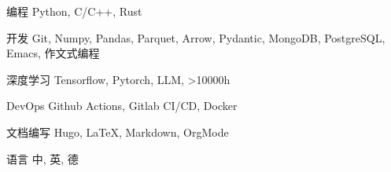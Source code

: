\documentclass[../cv_cn.tex]{subfiles}
\begin{document}


\begin{cvskills}

  \cvskill
    {编程} %
    {Python, C/C++, Rust} %

  \cvskill
    {开发} %
    {Git, Numpy, Pandas, Parquet, Arrow, Pydantic, MongoDB, PostgreSQL, Emacs, 作文式编程} %

  \cvskill
    {深度学习} %
    {Tensorflow, Pytorch, LLM, >10000h} %

  \cvskill
    {DevOps} %
    {Github Actions, Gitlab CI/CD, Docker} %

  \cvskill
    {文档编写} %
    {Hugo, LaTeX, Markdown, OrgMode} %

  \cvskill
    {语言} %
    {中, 英, 德} %

\end{cvskills}
\end{document}
